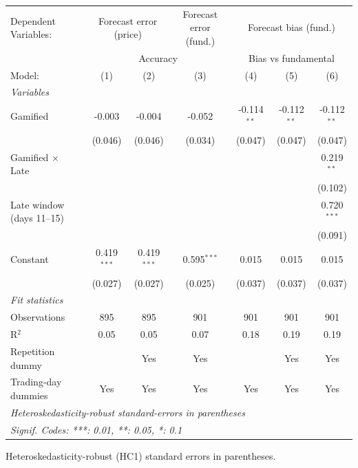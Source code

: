 \begingroup
\centering
\begin{tabular}{lcccccc}
   \tabularnewline \midrule \midrule
   Dependent Variables: & \multicolumn{2}{c}{Forecast error (price)} & Forecast error (fund.) & \multicolumn{3}{c}{Forecast bias (fund.)}\\
    & \multicolumn{3}{c}{Accuracy} & \multicolumn{3}{c}{Bias vs fundamental} \\ 
   Model:                    & (1)           & (2)           & (3)           & (4)           & (5)           & (6)\\  
   \midrule
   \emph{Variables}\\
   Gamified                  & -0.003        & -0.004        & -0.052        & -0.114$^{**}$ & -0.112$^{**}$ & -0.112$^{**}$\\   
                             & (0.046)       & (0.046)       & (0.034)       & (0.047)       & (0.047)       & (0.047)\\   
   Gamified $\times$ Late    &               &               &               &               &               & 0.219$^{**}$\\   
                             &               &               &               &               &               & (0.102)\\   
   Late window (days 11--15) &               &               &               &               &               & 0.720$^{***}$\\   
                             &               &               &               &               &               & (0.091)\\   
   Constant                  & 0.419$^{***}$ & 0.419$^{***}$ & 0.595$^{***}$ & 0.015         & 0.015         & 0.015\\   
                             & (0.027)       & (0.027)       & (0.025)       & (0.037)       & (0.037)       & (0.037)\\   
   \midrule
   \emph{Fit statistics}\\
   Observations              & 895           & 895           & 901           & 901           & 901           & 901\\  
   R$^2$                     & 0.05          & 0.05          & 0.07          & 0.18          & 0.19          & 0.19\\  
   Repetition dummy          &               & Yes           & Yes           &               & Yes           & Yes\\  
   Trading-day dummies       & Yes           & Yes           & Yes           & Yes           & Yes           & Yes\\  
   \midrule \midrule
   \multicolumn{7}{l}{\emph{Heteroskedasticity-robust standard-errors in parentheses}}\\
   \multicolumn{7}{l}{\emph{Signif. Codes: ***: 0.01, **: 0.05, *: 0.1}}\\
\end{tabular}
 
\par \raggedright 
Heteroskedasticity-robust (HC1) standard errors in parentheses.
\par\endgroup
